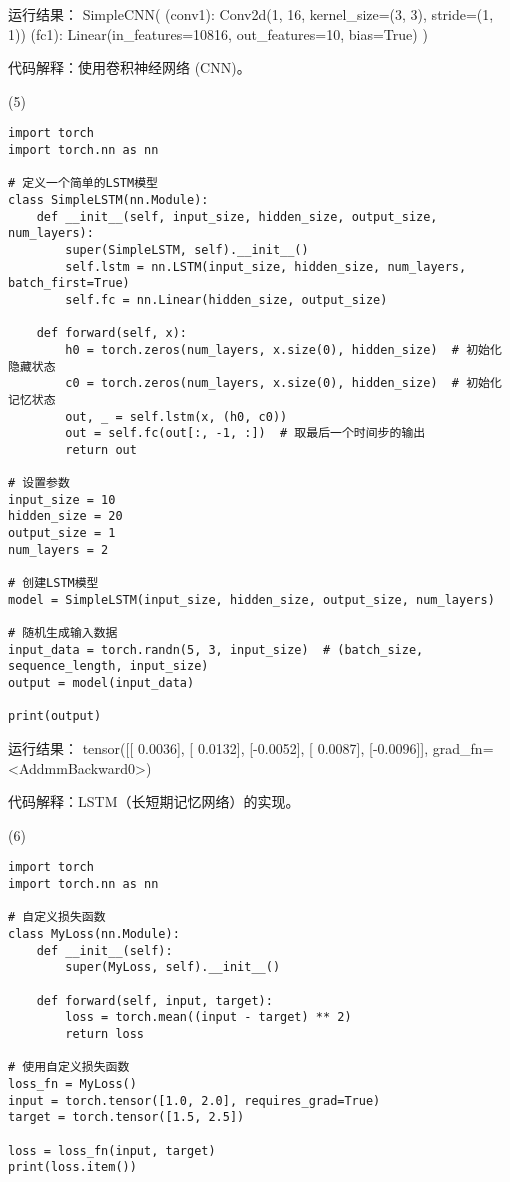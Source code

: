 \documentclass[a4paper, 12pt]{article}
\begin{document}
{\color{blue}
运行结果：
SimpleCNN(
  (conv1): Conv2d(1, 16, kernel\_size=(3, 3), stride=(1, 1))
  (fc1): Linear(in\_features=10816, out\_features=10, bias=True)
)
}

代码解释：使用卷积神经网络 (CNN)。

(5)
\begin{verbatim}
import torch
import torch.nn as nn

# 定义一个简单的LSTM模型
class SimpleLSTM(nn.Module):
    def __init__(self, input_size, hidden_size, output_size, num_layers):
        super(SimpleLSTM, self).__init__()
        self.lstm = nn.LSTM(input_size, hidden_size, num_layers, batch_first=True)
        self.fc = nn.Linear(hidden_size, output_size)

    def forward(self, x):
        h0 = torch.zeros(num_layers, x.size(0), hidden_size)  # 初始化隐藏状态
        c0 = torch.zeros(num_layers, x.size(0), hidden_size)  # 初始化记忆状态
        out, _ = self.lstm(x, (h0, c0))
        out = self.fc(out[:, -1, :])  # 取最后一个时间步的输出
        return out

# 设置参数
input_size = 10
hidden_size = 20
output_size = 1
num_layers = 2

# 创建LSTM模型
model = SimpleLSTM(input_size, hidden_size, output_size, num_layers)

# 随机生成输入数据
input_data = torch.randn(5, 3, input_size)  # (batch_size, sequence_length, input_size)
output = model(input_data)

print(output)
\end{verbatim}

{\color{blue}
运行结果：
tensor([[ 0.0036],
        [ 0.0132],
        [-0.0052],
        [ 0.0087],
        [-0.0096]], grad\_fn=<AddmmBackward0>)
}

代码解释：LSTM（长短期记忆网络）的实现。

(6)
\begin{verbatim}
import torch
import torch.nn as nn

# 自定义损失函数
class MyLoss(nn.Module):
    def __init__(self):
        super(MyLoss, self).__init__()

    def forward(self, input, target):
        loss = torch.mean((input - target) ** 2)
        return loss

# 使用自定义损失函数
loss_fn = MyLoss()
input = torch.tensor([1.0, 2.0], requires_grad=True)
target = torch.tensor([1.5, 2.5])

loss = loss_fn(input, target)
print(loss.item())
\end{verbatim}
\end{document}
